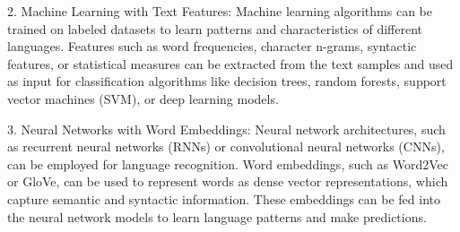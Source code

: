 \documentclass[a4paper]{article}
\begin{document}
2. Machine Learning with Text Features: Machine learning algorithms can be trained on labeled datasets to learn patterns and characteristics of different languages. Features such as word frequencies, character n-grams, syntactic features, or statistical measures can be extracted from the text samples and used as input for classification algorithms like decision trees, random forests, support vector machines (SVM), or deep learning models.

3. Neural Networks with Word Embeddings: Neural network architectures, such as recurrent neural networks (RNNs) or convolutional neural networks (CNNs), can be employed for language recognition. Word embeddings, such as Word2Vec or GloVe, can be used to represent words as dense vector representations, which capture semantic and syntactic information. These embeddings can be fed into the neural network models to learn language patterns and make predictions.

 








    
\end{document}
